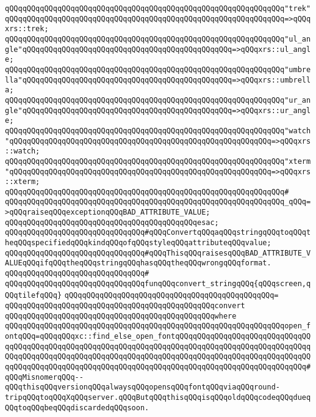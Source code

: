 \verb|qQQqqQQqqQQqqQQqqQQqqQQqqQQqqQQqqQQqqQQqqQQqqQQqqQQqqQQqqQQqqQQq"trek"qQQqqQQqqQQqqQQqqQQqqQQqqQQqqQQqqQQqqQQqqQQqqQQqqQQqqQQqqQQqqQQq=>qQQqxrs::trek;|\newline
\verb|qQQqqQQqqQQqqQQqqQQqqQQqqQQqqQQqqQQqqQQqqQQqqQQqqQQqqQQqqQQqqQQq"ul_angle"qQQqqQQqqQQqqQQqqQQqqQQqqQQqqQQqqQQqqQQqqQQqqQQq=>qQQqxrs::ul_angle;|\newline
\verb|qQQqqQQqqQQqqQQqqQQqqQQqqQQqqQQqqQQqqQQqqQQqqQQqqQQqqQQqqQQqqQQq"umbrella"qQQqqQQqqQQqqQQqqQQqqQQqqQQqqQQqqQQqqQQqqQQqqQQq=>qQQqxrs::umbrella;|\newline
\verb|qQQqqQQqqQQqqQQqqQQqqQQqqQQqqQQqqQQqqQQqqQQqqQQqqQQqqQQqqQQqqQQq"ur_angle"qQQqqQQqqQQqqQQqqQQqqQQqqQQqqQQqqQQqqQQqqQQqqQQq=>qQQqxrs::ur_angle;|\newline
\verb|qQQqqQQqqQQqqQQqqQQqqQQqqQQqqQQqqQQqqQQqqQQqqQQqqQQqqQQqqQQqqQQq"watch"qQQqqQQqqQQqqQQqqQQqqQQqqQQqqQQqqQQqqQQqqQQqqQQqqQQqqQQqqQQq=>qQQqxrs::watch;|\newline
\verb|qQQqqQQqqQQqqQQqqQQqqQQqqQQqqQQqqQQqqQQqqQQqqQQqqQQqqQQqqQQqqQQq"xterm"qQQqqQQqqQQqqQQqqQQqqQQqqQQqqQQqqQQqqQQqqQQqqQQqqQQqqQQqqQQq=>qQQqxrs::xterm;|\newline
\verb|qQQqqQQqqQQqqQQqqQQqqQQqqQQqqQQqqQQqqQQqqQQqqQQqqQQqqQQqqQQqqQQq#|\newline
\verb|qQQqqQQqqQQqqQQqqQQqqQQqqQQqqQQqqQQqqQQqqQQqqQQqqQQqqQQqqQQqqQQq_qQQq=>qQQqraiseqQQqexceptionqQQqBAD_ATTRIBUTE_VALUE;|\newline
\verb|qQQqqQQqqQQqqQQqqQQqqQQqqQQqqQQqqQQqqQQqqQQqesac;|\newline
\newline
\verb|qQQqqQQqqQQqqQQqqQQqqQQqqQQqqQQq#qQQqConvertqQQqaqQQqstringqQQqtoqQQqtheqQQqspecifiedqQQqkindqQQqofqQQqstyleqQQqattributeqQQqvalue;|\newline
\verb|qQQqqQQqqQQqqQQqqQQqqQQqqQQqqQQq#qQQqThisqQQqraisesqQQqBAD_ATTRIBUTE_VALUEqQQqifqQQqtheqQQqstringqQQqhasqQQqtheqQQqwrongqQQqformat.|\newline
\verb|qQQqqQQqqQQqqQQqqQQqqQQqqQQqqQQq#|\newline
\verb|qQQqqQQqqQQqqQQqqQQqqQQqqQQqqQQqfunqQQqconvert_stringqQQq{qQQqscreen,qQQqtilefqQQq}|\newline
\verb|qQQqqQQqqQQqqQQqqQQqqQQqqQQqqQQqqQQqqQQqqQQqqQQq=|\newline
\verb|qQQqqQQqqQQqqQQqqQQqqQQqqQQqqQQqqQQqqQQqqQQqqQQqconvert|\newline
\verb|qQQqqQQqqQQqqQQqqQQqqQQqqQQqqQQqqQQqqQQqqQQqqQQqwhere|\newline
\verb|qQQqqQQqqQQqqQQqqQQqqQQqqQQqqQQqqQQqqQQqqQQqqQQqqQQqqQQqqQQqqQQqopen_fontqQQq=qQQqqQQqxc::find_else_open_fontqQQqqQQqqQQqqQQqqQQqqQQqqQQqqQQqqQQqqQQqqQQqqQQqqQQqqQQqqQQqqQQqqQQqqQQqqQQqqQQqqQQqqQQqqQQqqQQqqQQqqQQqqQQqqQQqqQQqqQQqqQQqqQQqqQQqqQQqqQQqqQQqqQQqqQQqqQQqqQQqqQQqqQQqqQQqqQQqqQQqqQQqqQQqqQQqqQQqqQQqqQQqqQQqqQQqqQQqqQQqqQQqqQQqqQQqqQQqqQQq#qQQqMisnomerqQQq--qQQqthisqQQqversionqQQqalwaysqQQqopensqQQqfontqQQqviaqQQqround-tripqQQqtoqQQqXqQQqserver.qQQqButqQQqthisqQQqisqQQqoldqQQqcodeqQQqdueqQQqtoqQQqbeqQQqdiscardedqQQqsoon.|\newline
